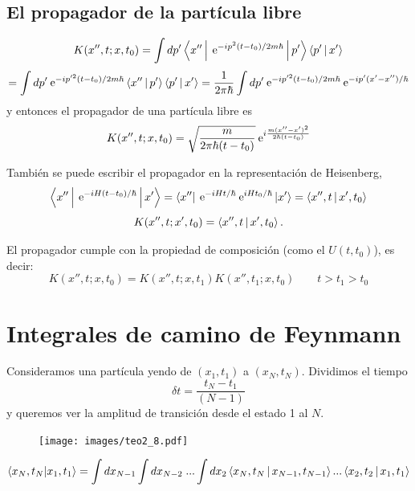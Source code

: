 \documentclass[10pt,oneside]{CBFT_book}
\begin{document}
\subsection{El propagador de la partícula libre}

\[
	K(x'',t; x, t_0) = \int dp' \Braket{x''|\:\mathrm{e}^{-ip^2(t-t_0)/2m\hbar}|p'} \Braket{p'|x'} 
\]
\[
	= \int dp' \:\mathrm{e}^{-ip'^{2}(t-t_0)/2m\hbar} \Braket{x''|p'} \Braket{p'|x'} =
	\frac{1}{2\pi\hbar} \int dp' \:\mathrm{e}^{-ip'^{2}(t-t_0)/2m\hbar} \:\mathrm{e}^{-ip'(x'-x'')/\hbar}
\]
y entonces el propagador de una partícula libre es
\[
	K(x'',t; x, t_0) = \sqrt{ \frac{m}{2\pi\hbar(t-t_0)} } \:\mathrm{e}^{i\frac{m(x''-x')^2}{2\hbar(t-t_0)}}
\]

También se puede escribir el propagador en la representación de Heisenberg,
\[
	\Braket{x''|\:\mathrm{e}^{-iH(t-t_0)/\hbar}|x'} = \Bra{x''}\:\mathrm{e}^{-iHt/\hbar} \:\mathrm{e}^{iHt_0/\hbar}\Ket{x'}=
		\Braket{x'',t|x',t_0}
\]
\[
	K(x'',t;x',t_0) = \Braket{x'',t | x',t_0}.
\]

El propagador cumple con la propiedad de composición (como el $U(t,t_0)$), es decir:
\[
	K(x'',t; x, t_0) = K(x'',t; x, t_1)K(x'',t_1; x, t_0) \qquad t>t_1>t_0
\]

\section{Integrales de camino de Feynmann}

Consideramos una partícula yendo de $(x_1,t_1)$ a $(x_N,t_N)$. Dividimos el tiempo 
\[
	\delta t = \frac{t_N-t_1}{(N-1)}
\]
y queremos ver la amplitud de transición desde el estado 1 al $N$.

\begin{figure}[htb]
	\begin{center}
	\texttt{[image: images/teo2\_8.pdf]}	 
	\end{center}
	\caption{}
\end{figure} 

\[
	\braket{x_N,t_N|x_1,t_1} = \int dx_{N-1}\int dx_{N-2} \; ...\int dx_2
	\Braket{x_N,t_N|x_{N-1},t_{N-1}} ...\Braket{x_2,t_2|x_1,t_1}
\]
\end{document}
